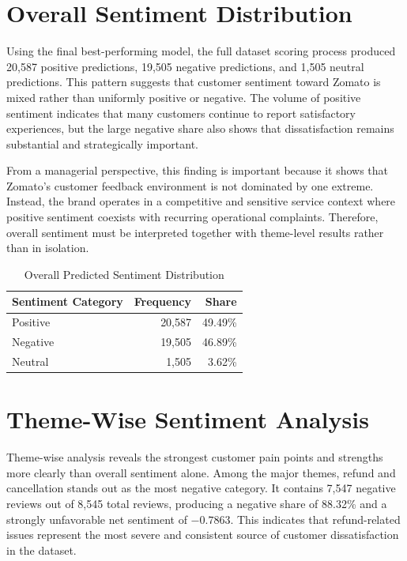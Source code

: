 \section{Overall Sentiment Distribution}

Using the final best-performing model, the full dataset scoring process produced 20,587 positive predictions, 19,505 negative predictions, and 1,505 neutral predictions. This pattern suggests that customer sentiment toward Zomato is mixed rather than uniformly positive or negative. The volume of positive sentiment indicates that many customers continue to report satisfactory experiences, but the large negative share also shows that dissatisfaction remains substantial and strategically important.

From a managerial perspective, this finding is important because it shows that Zomato's customer feedback environment is not dominated by one extreme. Instead, the brand operates in a competitive and sensitive service context where positive sentiment coexists with recurring operational complaints. Therefore, overall sentiment must be interpreted together with theme-level results rather than in isolation.


\begin{table}[h]
\centering
\caption{Overall Predicted Sentiment Distribution}
\begin{tabular}{lrr}
\toprule
\textbf{Sentiment Category} & \textbf{Frequency} & \textbf{Share} \\
\midrule
Positive & 20,587 & 49.49\% \\
Negative & 19,505 & 46.89\% \\
Neutral & 1,505 & 3.62\% \\
\bottomrule
\end{tabular}
\end{table}

\section{Theme-Wise Sentiment Analysis}

Theme-wise analysis reveals the strongest customer pain points and strengths more clearly than overall sentiment alone. Among the major themes, refund and cancellation stands out as the most negative category. It contains 7,547 negative reviews out of 8,545 total reviews, producing a negative share of 88.32\% and a strongly unfavorable net sentiment of $-0.7863$. This indicates that refund-related issues represent the most severe and consistent source of customer dissatisfaction in the dataset.


